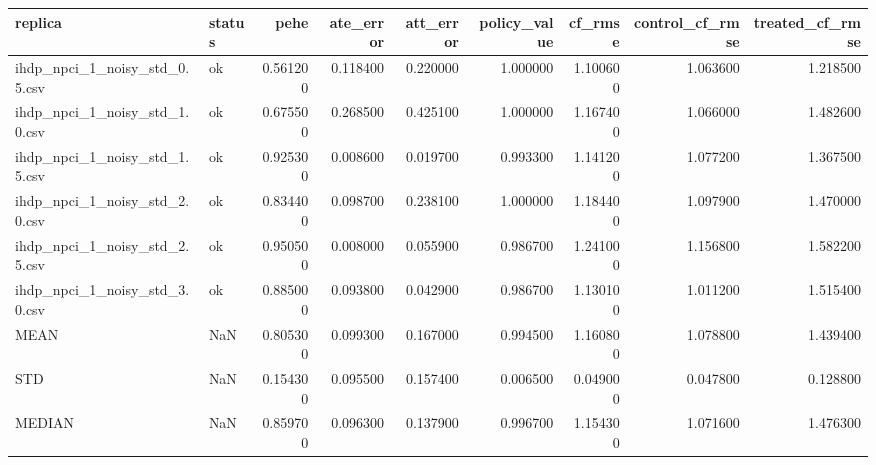 \begin{tabular}{llrrrrrrr}
\toprule
replica & status & pehe & ate_error & att_error & policy_value & cf_rmse & control_cf_rmse & treated_cf_rmse \\
\midrule
ihdp_npci_1_noisy_std_0.5.csv & ok & 0.561200 & 0.118400 & 0.220000 & 1.000000 & 1.100600 & 1.063600 & 1.218500 \\
ihdp_npci_1_noisy_std_1.0.csv & ok & 0.675500 & 0.268500 & 0.425100 & 1.000000 & 1.167400 & 1.066000 & 1.482600 \\
ihdp_npci_1_noisy_std_1.5.csv & ok & 0.925300 & 0.008600 & 0.019700 & 0.993300 & 1.141200 & 1.077200 & 1.367500 \\
ihdp_npci_1_noisy_std_2.0.csv & ok & 0.834400 & 0.098700 & 0.238100 & 1.000000 & 1.184400 & 1.097900 & 1.470000 \\
ihdp_npci_1_noisy_std_2.5.csv & ok & 0.950500 & 0.008000 & 0.055900 & 0.986700 & 1.241000 & 1.156800 & 1.582200 \\
ihdp_npci_1_noisy_std_3.0.csv & ok & 0.885000 & 0.093800 & 0.042900 & 0.986700 & 1.130100 & 1.011200 & 1.515400 \\
MEAN & NaN & 0.805300 & 0.099300 & 0.167000 & 0.994500 & 1.160800 & 1.078800 & 1.439400 \\
STD & NaN & 0.154300 & 0.095500 & 0.157400 & 0.006500 & 0.049000 & 0.047800 & 0.128800 \\
MEDIAN & NaN & 0.859700 & 0.096300 & 0.137900 & 0.996700 & 1.154300 & 1.071600 & 1.476300 \\
\bottomrule
\end{tabular}
